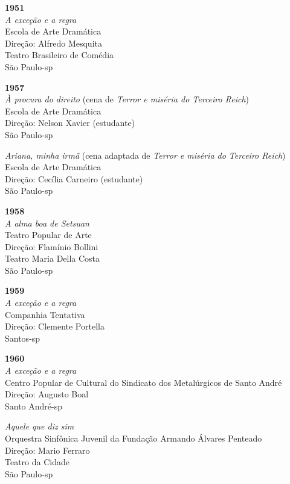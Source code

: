 \item{\bf 1951}\\
{\it A exceção e a regra}\\
Escola de Arte Dramática\\
Direção: Alfredo Mesquita\\
Teatro Brasileiro de Comédia\\
São Paulo-{\sc sp}

\item{\bf 1957}\\
{\it À procura do direito} (cena de {\it Terror e miséria do Terceiro
Reich})\\
Escola de Arte Dramática\\
Direção: Nelson Xavier (estudante)\\
São Paulo-{\sc sp}

{\it Ariana, minha irmã} (cena adaptada de {\it Terror e miséria do
Terceiro Reich})\\
Escola de Arte Dramática\\
Direção: Cecília Carneiro (estudante)\\
São Paulo-{\sc sp}

\item{\bf 1958}\\
{\it A alma boa de Setsuan}\\
Teatro Popular de Arte\\
Direção: Flamínio Bollini\\
Teatro Maria Della Costa\\
São Paulo-{\sc sp}

\item{\bf 1959}\\
{\it A exceção e a regra}\\
Companhia Tentativa\\
Direção: Clemente Portella\\
Santos-{\sc sp}

\item{\bf 1960}\\
{\it A exceção e a regra}\\
Centro Popular de Cultural do Sindicato dos Metalúrgicos de Santo André\\
Direção: Augusto Boal\\
Santo André-{\sc sp}

{\it Aquele que diz sim}\\
Orquestra Sinfônica Juvenil da Fundação Armando Álvares Penteado\\
Direção: Mario Ferraro\\
Teatro da Cidade\\
São Paulo-{\sc sp}

